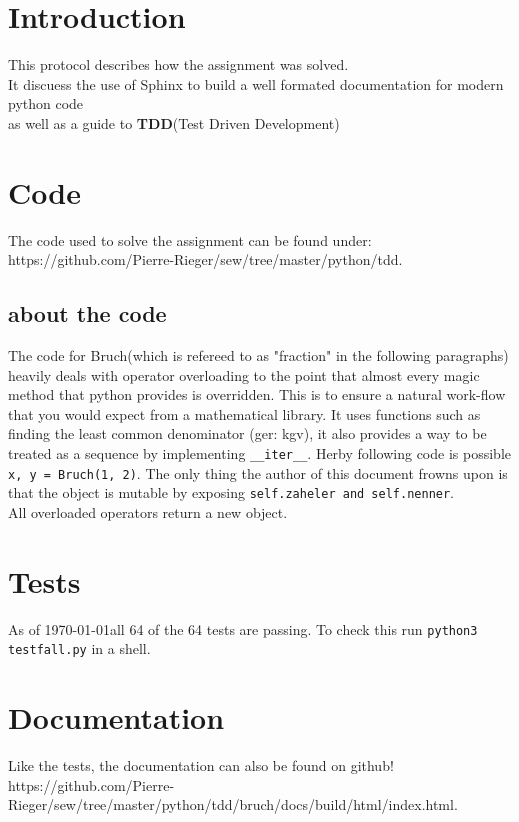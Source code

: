 \documentclass[letterpaper, 12pt]{article}
\begin{document}
\section{Introduction}
This protocol describes how the assignment was solved. \\
It discuess the use of Sphinx to build a well formated documentation for modern python code \\
as well as a guide to \textbf{TDD}(Test Driven Development)

\section{Code}
The code used to solve the assignment can be found under: \\
https://github.com/Pierre-Rieger/sew/tree/master/python/tdd. \\

\subsection{about the code}
The code for Bruch(which is refereed to as "fraction" in the following paragraphs) heavily deals with operator overloading to the point that 
almost every magic method that python provides is overridden. This is to ensure a natural work-flow that you would expect from a mathematical library.
It uses functions such as finding the least common denominator (ger: kgv), it also provides a way to be treated as a sequence by implementing \verb|__iter__|.
Herby following code is possible \verb|x, y = Bruch(1, 2)|.
The only thing the author of this document frowns upon is that the object is mutable by exposing \verb|self.zaheler and self.nenner|.\\

All overloaded operators return a new object.

\section{Tests}
As of \today all 64 of the 64 tests are passing.
To check this run \verb|python3 testfall.py| in a shell. \\


\section{Documentation}
Like the tests, the documentation can also be found on github! \\
https://github.com/Pierre-Rieger/sew/tree/master/python/tdd/bruch/docs/build/html/index.html.



\clearpage



\listoftables
\lstlistoflistings
\listoffigures


	
\end{document}
